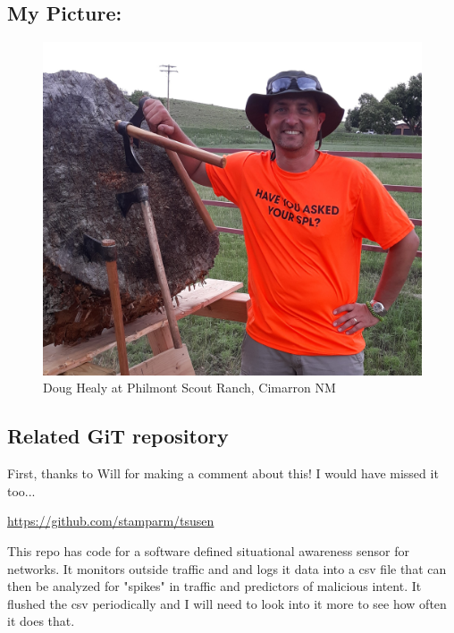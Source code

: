\subsection{My Picture: }
\begin{figure}[htp]
    \centering
    \includegraphics[scale=.095]{Healy.jpg}
    \caption{Doug Healy at Philmont Scout Ranch, Cimarron NM}
 \end{figure}
 
\subsection{Related GiT repository}
First, thanks to Will for making a comment about this! I would have missed it too...

\url{https://github.com/stamparm/tsusen} 

This repo has code for a software defined situational awareness sensor for networks. It monitors outside traffic and and logs it data into a csv file that can then be analyzed for "spikes" in traffic and predictors of malicious intent. It flushed the csv periodically and I will need to look into it more to see how often it does that.

